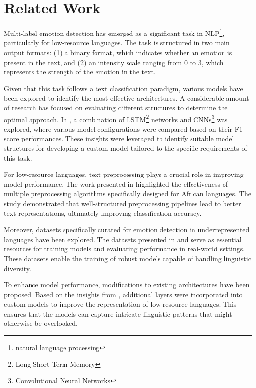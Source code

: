 \section{Related Work}
Multi-label emotion detection has emerged as a significant task in NLP\footnote{natural language processing}, particularly for low-resource languages. The task is structured in two main output formats: (1) a binary format, which indicates whether an emotion is present in the text, and (2) an intensity scale ranging from 0 to 3, which represents the strength of the emotion in the text.

Given that this task follows a text classification paradigm, various models have been explored to identify the most effective architectures. A considerable amount of research has focused on evaluating different structures to determine the optimal approach. In \cite{wang2016dimensional}, a combination of LSTM\footnote{Long Short-Term Memory} networks and CNNs\footnote{Convolutional Neural Networks} was explored, where various model configurations were compared based on their F1-score performances. These insights were leveraged to identify suitable model structures for developing a custom model tailored to the specific requirements of this task.


For low-resource languages, text preprocessing plays a crucial role in improving model performance. The work presented in \cite{muhammad2023semeval} highlighted the effectiveness of multiple preprocessing algorithms specifically designed for African languages. The study demonstrated that well-structured preprocessing pipelines lead to better text representations, ultimately improving classification accuracy.

Moreover, datasets specifically curated for emotion detection in underrepresented languages have been explored. The datasets presented in \cite{muhammad2025brighterbridginggaphumanannotated} and \cite{belay-etal-2025-evaluating} serve as essential resources for training models and evaluating performance in real-world settings. These datasets enable the training of robust models capable of handling linguistic diversity.

To enhance model performance, modifications to existing architectures have been proposed. Based on the insights from \cite{wang2016dimensional}, additional layers were incorporated into custom models to improve the representation of low-resource languages. This ensures that the models can capture intricate linguistic patterns that might otherwise be overlooked.